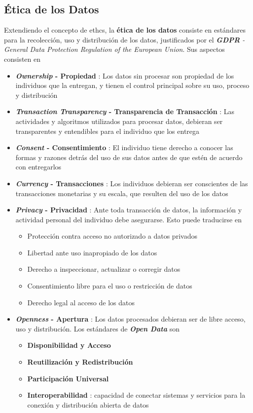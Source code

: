 \subsection{Ética de los Datos}
Extendiendo el concepto de \gls{ethcs}, la \textbf{ética de los datos} consiste en estándares para la recolección, uso y distribución de los datos, justificados por el \textit{\textbf{GDPR} - General Data Protection Regulation of the European Union}. Sus aspectos consisten en
\begin{itemize}
    \item {\textbf{\textit{Ownership} - Propiedad} : Los datos sin procesar son propiedad de los individuos que la entregan, y tienen el control principal sobre su uso, proceso y distribución}
    \item {\textbf{\textit{Transaction Transparency} - Transparencia de Transacción} : Las actividades y algoritmos utilizados para procesar datos, debieran ser transparentes y entendibles para el individuo que los entrega}
    \item {\textbf{\textit{Consent} - Consentimiento} : El individuo tiene derecho a conocer las formas y razones detrás del uso de sus datos antes de que estén de acuerdo con entregarlos}
    \item {\textbf{\textit{Currency} - Transacciones} : Los individuos debieran ser conscientes de las transacciones monetarias y su escala, que resulten del uso de los datos}
    \item {\textbf{\textit{Privacy} - Privacidad} : Ante toda transacción de datos, la información y actividad personal del individuo debe asegurarse. Esto puede traducirse en
    \begin{itemize}
        \item {Protección contra acceso no autorizado a datos privados}
        \item {Libertad ante uso inapropiado de los datos}
        \item {Derecho a inspeccionar, actualizar o corregir datos}
        \item {Consentimiento libre para el uso o restricción de datos}
        \item {Derecho legal al acceso de los datos}
    \end{itemize}}
    \item {\textbf{\textit{Openness} - Apertura} : Los datos procesados debieran ser de libre acceso, uso y distribución. Los estándares de \textbf{\textit{Open Data}} son
    \begin{itemize}
        \item {\textbf{Disponibilidad y Acceso}}
        \item {\textbf{Reutilización y Redistribución}}
        \item {\textbf{Participación Universal}}
        \item {\textbf{Interoperabilidad} : capacidad de conectar sistemas y servicios para la conexión y distribución abierta de datos}
    \end{itemize}}
\end{itemize}

